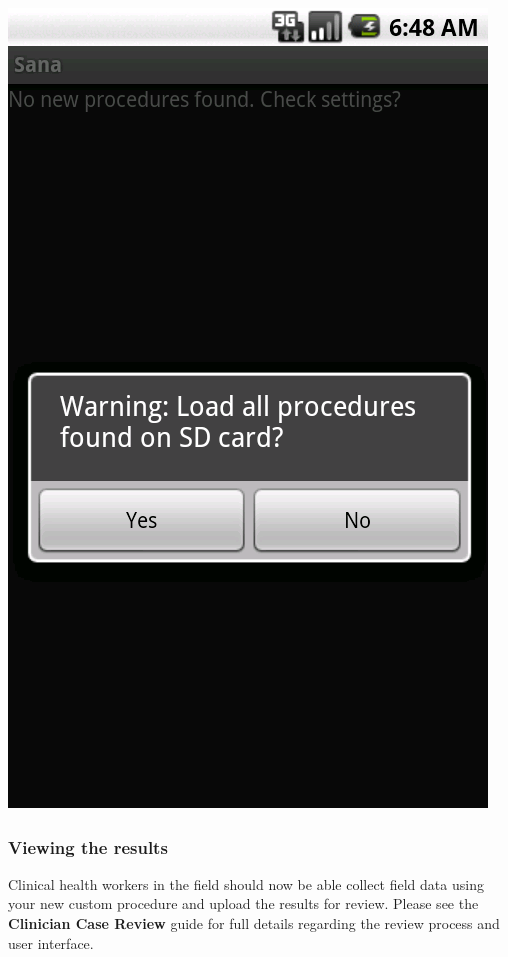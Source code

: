 \documentclass[a4paper,10pt]{article}
\begin{document}
\includegraphics[scale=0.2,keepaspectratio=true]{client_settings_procedures_load_prompt.png}

\subsubsection{Viewing the results}
Clinical health workers in the field should now be able collect field data using
your new custom procedure and upload the results for review. Please see the
\textbf{Clinician Case Review} guide for full details regarding the review
process and user interface.
\clearpage{}

\cite{
http://www.nhlbi.nih.gov/guidelines/obesity/e_txtbk/txgd/algorthm/algorthm.htm}
\end{document}
